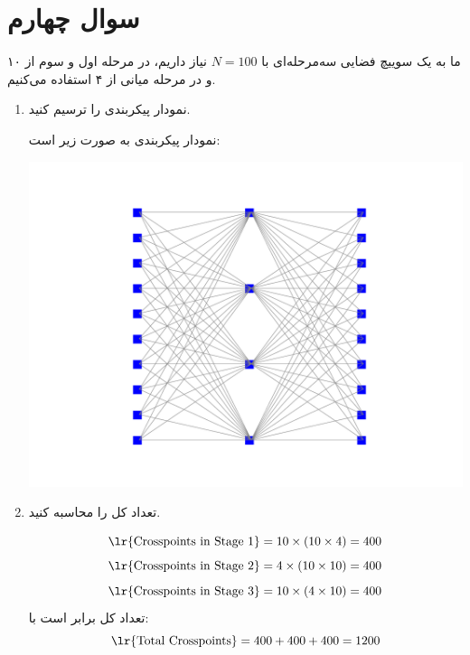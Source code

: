 \section{سوال چهارم}



ما به یک سوییچ فضایی سه‌مرحله‌ای با $N=100 $ نیاز داریم، در مرحله اول و سوم از ۱۰  و در مرحله میانی از ۴  استفاده می‌کنیم.

\begin{enumerate}
	\item 
	نمودار پیکربندی را ترسیم کنید.
	\begin{qsolve}
		نمودار پیکربندی به صورت زیر است:
	\end{qsolve}
	
	\begin{center}
		\includegraphics*[width=1\linewidth]{pics/img7.pdf}
		\label{پیکربندی سوال ۴}
	\end{center}
	
	
	
	
	\item 
	تعداد کل  را محاسبه کنید.
	\begin{qsolve}
		\[
		\text{\lr{Crosspoints in Stage 1}} = 10 \times (10 \times 4) = 400
		\]
		\[
		\text{\lr{Crosspoints in Stage 2}} = 4 \times (10 \times 10) = 400
		\]
		\[
		\text{\lr{Crosspoints in Stage 3}} = 10 \times (4 \times 10) = 400
		\]
		تعداد کل  برابر است با:
		\[
		\text{\lr{Total Crosspoints}} = 400 + 400 + 400 = 1200
		\]
		
	\end{qsolve}
	

\end{enumerate}
